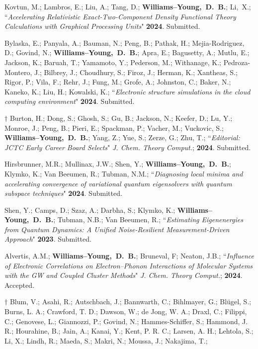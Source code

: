 \documentclass[10pt]{res} %
\newcommand*\me[0]{{\bf Williams--Young,~D.~B.}}
\newcommand*\xsli[0]{Li,~X.}
\begin{document}
\begin{resume}
\begin{etaremune}
  \item Kovtun, M.; Lambros, E.; Liu, A.; Tang, D.; \me; \xsli;
        ``\emph{Accelerating Relativistic Exact-Two-Component Density Functional Theory Calculations with Graphical Processing Units}"
        \textbf{2024}. Submitted.
  \item Bylaska, E.; Panyala, A.; Bauman, N.; Peng, B.; Pathak, H.; Mejia-Rodriguez, D.; Govind, N.; \me; Apra, E.; 
        Bagusetty, A.; Mutlu, E.; Jackson, K.; Baruah, T.; Yamamoto, Y.; Pederson, M.; Withanage, K.; Pedroza-Montero, J.; 
        Bilbrey, J.; Choudhury, S.; Firoz, J.; Herman, K.; Xantheas, S.; Rigor, P.; Vila, F.; Rehr, J.; Fung, M.; Grofe, A.; 
        Johnston, C.; Baker, N.; Kaneko, K.; Liu, H.; Kowalski, K.;
        ``\emph{Electronic structure simulations in the cloud computing environment}"
        \textbf{2024}. Submitted.
  \item $\dagger$ Burton, H.; Dong, S.; Ghosh, S.; Gu, B.; Jackson, N.; Keefer, D.; Lu, Y.; Monroe, J.; Peng, B.; Pieri, E.; 
        Spackman, P.; Vacher, M.; Vuckovic, S.; \me; Yang, Z.; Yue, S.; Zerze, G.; Zhu, T.;
        ``\emph{Editorial: JCTC Early Career Board Selects}"
        \emph{J. Chem. Theory Comput.}; \textbf{2024}. Submitted.
  \item Hirsbrunner, M.R.; Mullinax, J.W.; Shen, Y.; \me; Klymko, K.; Van Beeumen, R.; Tubman, N.M.;
        ``\emph{Diagnosing local minima and accelerating convergence of variational quantum eigensolvers with quantum subspace techniques}"
       \textbf{2024}. Submitted.
  \item Shen, Y.; Camps, D.; Szaz, A.; Darbha, S.; Klymko, K.; \me; Tubman, N.B.; Van Beeumen, R.;
        ``\emph{Estimating Eigenenergies from Quantum Dynamics: A Unified Noise-Resilient Measurement-Driven Approach}"
        \textbf{2023}. Submitted.
  \item Alvertis, A.M.; \me; Bruneval, F; Neaton, J.B.;
       ``\emph{Influence of Electronic Correlations on Electron–Phonon Interactions of Molecular Systems with the GW and Coupled Cluster Methods}"
       \emph{J. Chem. Theory Comput.}; \textbf{2024}. Accepted. 
  \item $\dagger$ Blum, V.; Asahi, R.; Autschbach, J.; Bannwarth, C.; Bihlmayer, G.; Blügel, S.; Burns, L. A.; 
        Crawford, T. D.; Dawson, W.; de Jong, W. A.; Draxl, C.; Filippi, C.; Genovese, L.; Giannozzi, P.; 
        Govind, N.; Hammes-Schiffer, S.; Hammond, J. R.; Hourahine, B.; Jain, A.; Kanai, Y.; Kent, P. R. C.; 
        Larsen, A. H.; Lehtola, S.; Li, X.; Lindh, R.; Maeda, S.; Makri, N.; Moussa, J.; Nakajima, T.; 

\end{etaremune}
\end{resume}
\end{document}
